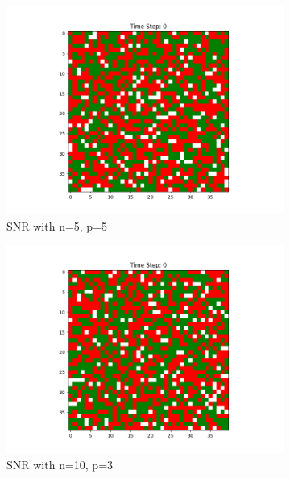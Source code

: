 \documentclass[11pt]{article}
\begin{document}
\begin{figure}[h]
		\begin{subfigure}{0.14\textwidth}
			\includegraphics[width=\linewidth]{initial_social_n5p5.png}
			\caption{\centering SNR with n=5, p=5}
		\end{subfigure}\hfill
		\begin{subfigure}{0.14\textwidth}
			\includegraphics[width=\linewidth]{initial_social_n10p3.png}
			\caption{\centering SNR with n=10, p=3}
		\end{subfigure}\hfill
		\begin{subfigure}{0.14\textwidth}

\end{subfigure}
\end{figure}
\end{document}
